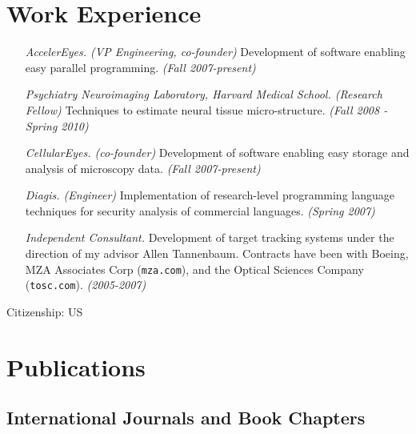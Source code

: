 \documentclass{article}
\begin{document}
\section*{Work Experience}
\begin{enumerate}
\item[\textit{AccelerEyes. (VP Engineering, co-founder)}] Development of
  software enabling easy parallel programming.  \textit{(Fall 2007-present)}
\item[\textit{Psychiatry Neuroimaging Laboratory, Harvard Medical
    School. (Research Fellow)}] Techniques to estimate neural tissue
  micro-structure.  \textit{(Fall 2008 - Spring 2010)}
\item[\textit{CellularEyes. (co-founder)}] Development of
  software enabling easy storage and analysis of microscopy data.
  \textit{(Fall 2007-present)}
\item[\textit{Diagis. (Engineer)}] Implementation of research-level
  programming language techniques for security analysis of commercial
  languages.  \textit{(Spring 2007)}
\item[\textit{Independent Consultant.}] Development of target tracking systems
  under the direction of my advisor Allen Tannenbaum.  Contracts have been
  with Boeing, MZA Associates Corp (\texttt{mza.com}), and the Optical
  Sciences Company (\texttt{tosc.com}). \textit{(2005-2007)}
\end{enumerate}

Citizenship: US



\section*{Publications}
\subsection*{International Journals and Book Chapters}
\begin{bibunit}
  \nocite{
    lienhard2011bitensor,
    Larsen2011,
    ng_stg,
    Fillard_fibercup,
    malcolm2011rabipa,
    malcolm2010tmi,
    Rathi2009pdf,
    malcolm2010mia,
    rathi2010mrm,
    agar2010ac,
    Rathi2010ls,
    Vela2007,
    Georgiou2007}
  \putbib
\end{bibunit}
\end{document}
